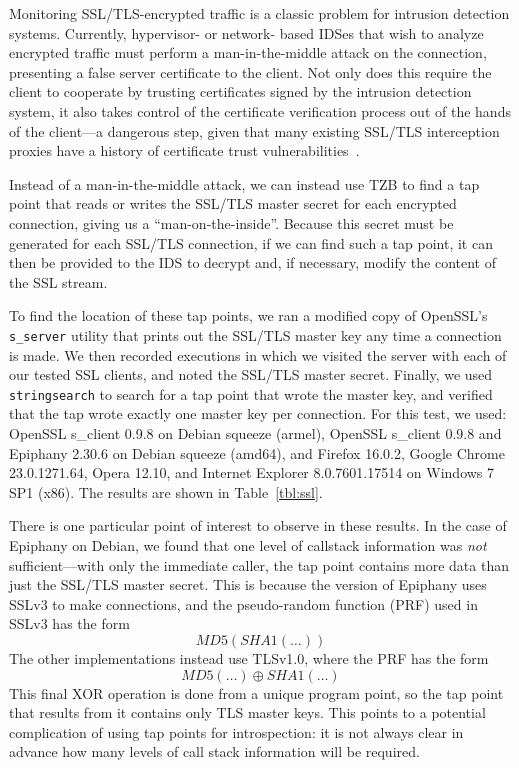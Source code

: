 Monitoring SSL/TLS-encrypted traffic is a classic problem for intrusion
detection systems. Currently, hypervisor- or network- based IDSes that
wish to analyze encrypted traffic must perform a man-in-the-middle
attack on the connection, presenting a false server certificate to the
client. Not only does this require the client to cooperate by trusting
certificates signed by the intrusion detection system, it also takes
control of the certificate verification process out of the hands of the
client---a dangerous step, given that many existing SSL/TLS interception
proxies have a history of certificate trust
vulnerabilities~\cite{JarmocBHEU2012}.

Instead of a man-in-the-middle attack, we can instead use TZB to find a
tap point that reads or writes the SSL/TLS master secret for each
encrypted connection, giving us a ``man-on-the-inside''. Because this
secret must be generated for each SSL/TLS connection, if we can find
such a tap point, it can then be provided to the IDS to decrypt and, if
necessary, modify the content of the SSL stream.

To find the location of these tap points, we ran a modified copy of
OpenSSL's \texttt{s\_server} utility that prints out the SSL/TLS master
key any time a connection is made. We then recorded executions in which
we visited the server with each of our tested SSL clients, and noted the
SSL/TLS master secret. Finally, we used \texttt{stringsearch} to search
for a tap point that wrote the master key, and verified that the tap
wrote exactly one master key per connection. For this test, we used:
OpenSSL s\_client 0.9.8 on Debian squeeze (armel), OpenSSL s\_client
0.9.8 and Epiphany 2.30.6 on Debian squeeze (amd64), and Firefox
16.0.2, Google Chrome 23.0.1271.64, Opera 12.10, and Internet Explorer
8.0.7601.17514 on Windows 7 SP1 (x86). The results are shown in
Table~\ref{tbl:ssl}.

There is one particular point of interest to observe in these results.
In the case of Epiphany on Debian, we found that one level of callstack
information was \emph{not} sufficient---with only the immediate caller,
the tap point contains more data than just the SSL/TLS master secret.
This is because the version of Epiphany uses SSLv3 to make connections,
and the pseudo-random function (PRF) used in SSLv3 has the form
\[ MD5(SHA1(\ldots))\] The other implementations instead use TLSv1.0, where
the PRF has the form \[ MD5(\ldots) \oplus SHA1(\ldots) \] This final
XOR operation is done from a unique program point, so the tap point that
results from it contains only TLS master keys. This points to a
potential complication of using tap points for introspection: it is not
always clear in advance how many levels of call stack information will
be required.

